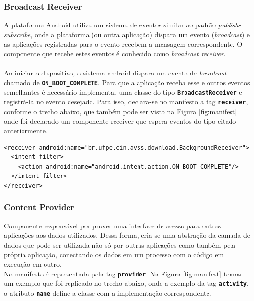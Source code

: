 \documentclass[a4paper,12pt]{article}
\begin{document}
\subsubsection{Broadcast Receiver}

A plataforma Android utiliza um sistema de eventos similar ao padrão \textit{publish-subscribe}, onde a plataforma (ou outra aplicação) dispara um evento (\textit{broadcast}) e as aplicações registradas para o evento recebem a mensagem correspondente. O componente que recebe estes eventos é conhecido como \textit{broadcast receiver}.\\
\\
\sloppy
Ao iniciar o dispositivo, o sistema android dispara um evento de \textit{broadcast} chamado de {\small\texttt{\textbf{ON\_BOOT\_COMPLETE}}}. Para que a aplicação receba esse e outros eventos semelhantes é necessário implementar uma classe do tipo {\small\texttt{\textbf{BroadcastReceiver}}} e registrá-la no evento desejado. Para isso, declara-se no manifesto a tag {\small\texttt{\textbf{receiver}}}, conforme o trecho abaixo, que também pode ser visto na Figura \ref{fig:manifest} onde foi declarado um componente receiver que espera eventos do tipo citado anteriormente.
{\fontsize{9pt}{12pt}
\begin{verbatim}
<receiver android:name="br.ufpe.cin.avss.download.BackgroundReceiver">
  <intent-filter>
    <action android:name="android.intent.action.ON_BOOT_COMPLETE"/>
  </intent-filter>
</receiver>
\end{verbatim}
}

\subsubsection{Content Provider}
\label{sec:provider}
Componente responsável por prover uma interface de acesso para outras aplicações aos dados utilizados. Dessa forma, cria-se uma abstração da camada de dados que pode ser utilizada não só por outras aplicações como também pela própria aplicação, conectando os dados em um processo com o código em execução em outro.\\

No manifesto é representada pela tag {\small\texttt{\textbf{provider}}}. Na Figura \ref{fig:manifest} temos um exemplo que foi replicado no trecho abaixo, onde a exemplo da tag {\small\texttt{\textbf{activity}}}, o atributo {\small\texttt{\textbf{name}}} define a classe com a implementação correspondente.\\
\end{document}
